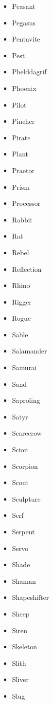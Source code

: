 \documentclass{article}
\begin{document}
\begin{multicols}{3}
\begin{itemize}
        \item Peasant
        \item Pegasus
        \item Pentavite
        \item Pest
        \item Phelddagrif
        \item Phoenix
        \item Pilot
        \item Pincher
        \item Pirate
        \item Plant
        \item Praetor
        \item Prism
        \item Processor
        \item Rabbit
        \item Rat
        \item Rebel
        \item Reflection
        \item Rhino
        \item Rigger
        \item Rogue
        \item Sable
        \item Salamander
        \item Samurai
        \item Sand
        \item Saproling
        \item Satyr
        \item Scarecrow
        \item Scion
        \item Scorpion
        \item Scout
        \item Sculpture
        \item Serf
        \item Serpent
        \item Servo
        \item Shade
        \item Shaman
        \item Shapeshifter
        \item Sheep
        \item Siren
        \item Skeleton
        \item Slith
        \item Sliver
        \item Slug

\end{itemize}
\end{multicols}
\end{document}
